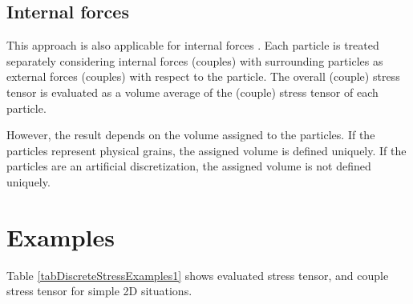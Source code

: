 \subsection{Internal forces}
This approach is also applicable for internal forces \cite{BardetVardoulakis2001a,CundallStrack1979a}.
Each particle is treated separately considering internal forces (couples) with surrounding particles as external forces (couples) with respect to the particle.
The overall (couple) stress tensor is evaluated as a volume average of the (couple) stress tensor of each particle.

However, the result depends on the volume assigned to the particles.
If the particles represent physical grains, the assigned volume is defined uniquely.
If the particles are an artificial discretization, the assigned volume is not defined uniquely.


\section{Examples}\label{secDemDiscreteStressExamples}
Table \ref{tabDiscreteStressExamples1} shows evaluated stress tensor, and couple stress tensor for simple 2D situations.

